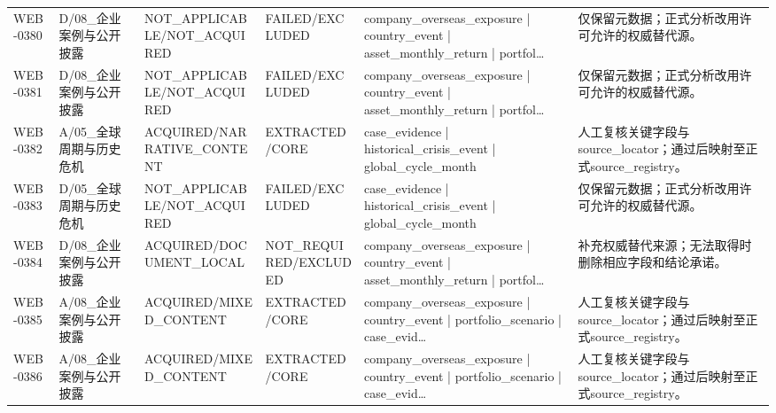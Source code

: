 \begin{landscape}
\begin{longtable}{p{1.8cm}p{2.6cm}p{2.6cm}p{2.6cm}p{4.8cm}p{7.2cm}}
WEB-0380 & D/\allowbreak{}08\_\allowbreak{}企业案例与公开披露 & NOT\_\allowbreak{}APPLICABLE/\allowbreak{}NOT\_\allowbreak{}ACQUIRED & FAILED/\allowbreak{}EXCLUDED & company\_\allowbreak{}overseas\_\allowbreak{}exposure | country\_\allowbreak{}event | asset\_\allowbreak{}monthly\_\allowbreak{}return | portfol… & 仅保留元数据；正式分析改用许可允许的权威替代源。\\
WEB-0381 & D/\allowbreak{}08\_\allowbreak{}企业案例与公开披露 & NOT\_\allowbreak{}APPLICABLE/\allowbreak{}NOT\_\allowbreak{}ACQUIRED & FAILED/\allowbreak{}EXCLUDED & company\_\allowbreak{}overseas\_\allowbreak{}exposure | country\_\allowbreak{}event | asset\_\allowbreak{}monthly\_\allowbreak{}return | portfol… & 仅保留元数据；正式分析改用许可允许的权威替代源。\\
WEB-0382 & A/\allowbreak{}05\_\allowbreak{}全球周期与历史危机 & ACQUIRED/\allowbreak{}NARRATIVE\_\allowbreak{}CONTENT & EXTRACTED/\allowbreak{}CORE & case\_\allowbreak{}evidence | historical\_\allowbreak{}crisis\_\allowbreak{}event | global\_\allowbreak{}cycle\_\allowbreak{}month & 人工复核关键字段与source\_\allowbreak{}locator；通过后映射至正式source\_\allowbreak{}registry。\\
WEB-0383 & D/\allowbreak{}05\_\allowbreak{}全球周期与历史危机 & NOT\_\allowbreak{}APPLICABLE/\allowbreak{}NOT\_\allowbreak{}ACQUIRED & FAILED/\allowbreak{}EXCLUDED & case\_\allowbreak{}evidence | historical\_\allowbreak{}crisis\_\allowbreak{}event | global\_\allowbreak{}cycle\_\allowbreak{}month & 仅保留元数据；正式分析改用许可允许的权威替代源。\\
WEB-0384 & D/\allowbreak{}08\_\allowbreak{}企业案例与公开披露 & ACQUIRED/\allowbreak{}DOCUMENT\_\allowbreak{}LOCAL & NOT\_\allowbreak{}REQUIRED/\allowbreak{}EXCLUDED & company\_\allowbreak{}overseas\_\allowbreak{}exposure | country\_\allowbreak{}event | asset\_\allowbreak{}monthly\_\allowbreak{}return | portfol… & 补充权威替代来源；无法取得时删除相应字段和结论承诺。\\
WEB-0385 & A/\allowbreak{}08\_\allowbreak{}企业案例与公开披露 & ACQUIRED/\allowbreak{}MIXED\_\allowbreak{}CONTENT & EXTRACTED/\allowbreak{}CORE & company\_\allowbreak{}overseas\_\allowbreak{}exposure | country\_\allowbreak{}event | portfolio\_\allowbreak{}scenario | case\_\allowbreak{}evid… & 人工复核关键字段与source\_\allowbreak{}locator；通过后映射至正式source\_\allowbreak{}registry。\\
WEB-0386 & A/\allowbreak{}08\_\allowbreak{}企业案例与公开披露 & ACQUIRED/\allowbreak{}MIXED\_\allowbreak{}CONTENT & EXTRACTED/\allowbreak{}CORE & company\_\allowbreak{}overseas\_\allowbreak{}exposure | country\_\allowbreak{}event | portfolio\_\allowbreak{}scenario | case\_\allowbreak{}evid… & 人工复核关键字段与source\_\allowbreak{}locator；通过后映射至正式source\_\allowbreak{}registry。\\

\end{longtable}
\end{landscape}
